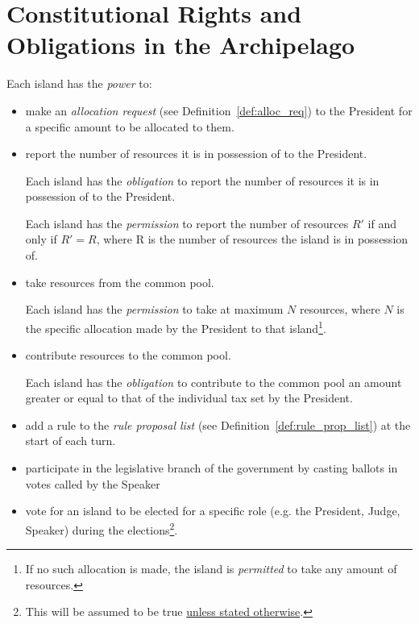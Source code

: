 \section{Constitutional Rights and Obligations in the Archipelago}
\label{sec:const_rights_obl_archi}
Each island has the \emph{power} to:
\begin{itemize}
\item make an \emph{allocation request} (see Definition~\ref{def:alloc_req}) to the President for a specific amount to be allocated to them.
\item report the number of resources it is in possession of to the President.
\begin{rule_IIGO}
    Each island has the \emph{obligation} to report the number of resources it is in possession of to the President.
\end{rule_IIGO}
\begin{rule_IIGO}
    Each island has the \emph{permission} to report the number of resources $R'$ if and only if $R' = R$, where R is the number of resources the island is in possession of.
\end{rule_IIGO}
\item take resources from the common pool.


\begin{rule_IIGO}
    Each island has the \emph{permission} to take at maximum $N$ resources, where $N$ is the specific allocation made by the President to that island\footnote{If no such allocation is made, the island is \emph{permitted} to take any amount of resources.}.
\end{rule_IIGO}
\item contribute resources to the common pool.
\begin{rule_IIGO}
    Each island has the \emph{obligation} to contribute to the common pool an amount greater or equal to that of the individual tax set by the President.
\end{rule_IIGO}
\item add a rule to the \emph{rule proposal list} (see Definition~\ref{def:rule_prop_list}) at the start of each turn.
\item participate in the legislative branch of the government by casting ballots in votes called by the Speaker
\item vote for an island to be elected for a specific role (e.g. the President, Judge, Speaker) during the elections\footnote{This will be assumed to be true \underline{unless stated otherwise}. %
        }.
\end{itemize}
